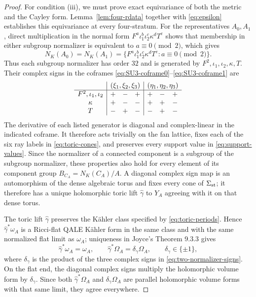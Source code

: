 \documentclass[11pt]{article}
\theoremstyle{remark}\newtheorem{remark}[theorem]{Remark}
\begin{document}
\begin{proof}
For condition (iii), we must prove exact equivariance of both the metric
and the Cayley form.  Lemma~\ref{lem:four-rdata} together with
\eqref{eq:epsilon} establishes this equivariance at every four-stratum.
For the representatives $A_0,A_1$, direct multiplication in the normal
form $F^a\iota_1^b\iota_2^c\kappa^dT^e$ shows that membership in either
subgroup normalizer is equivalent to $a\equiv0\pmod2$, which gives
\begin{equation}\label{eq:two-normalizers}
N_K(A_0)=N_K(A_1)
=\{F^a\iota_1^b\iota_2^c\kappa^dT^e:a\equiv0\pmod2\}.
\end{equation}
Thus each subgroup normalizer has order $32$ and is generated by
$F^2,\iota_1,\iota_2,\kappa,T$.  Their complex signs in the coframes
\eqref{eq:SU3-coframe0}--\eqref{eq:SU3-coframe1} are
\begin{equation}\label{eq:two-normalizer-signs}
\begin{array}{c|ccc|ccc}
&\multicolumn{3}{c|}{(\xi_1,\xi_2,\xi_3)}
&\multicolumn{3}{c}{(\eta_1,\eta_2,\eta_3)}\\
\hline
F^2,\iota_1,\iota_2&+&-&+&+&-&+\\
\kappa&+&-&-&+&+&-\\
T&-&+&-&-&+&-
\end{array}
\end{equation}
The derivative of each listed generator is diagonal and complex-linear in
the indicated coframe.  It therefore acts trivially on the fan lattice,
fixes each of the six ray labels in \eqref{eq:toric-cones}, and preserves
every support value in \eqref{eq:support-values}.  Since the normalizer of
a connected component is a subgroup of the subgroup normalizer, these
properties also hold for every element of its component group
$B_{C_A}=N_K(C_A)/A$.  A diagonal complex sign map is an automorphism of
the dense algebraic torus and fixes every cone of
$\Sigma_{\rm st}$; it therefore has a unique holomorphic toric lift
$\widehat\gamma$ to $Y_A$ agreeing with it on that dense torus.

The toric lift $\widehat\gamma$ preserves the K\"ahler class specified by
\eqref{eq:toric-periods}.  Hence $\widehat\gamma^*\omega_A$ is a
Ricci-flat QALE K\"ahler form in the same class and with the same normalized
flat limit as $\omega_A$; uniqueness in Joyce's Theorem 9.3.3 gives
\begin{equation}\label{eq:normalizer-CY}
\widehat\gamma^*\omega_A=\omega_A,\qquad
\widehat\gamma^*\Omega_A=\delta_\gamma\Omega_A,\qquad
\delta_\gamma\in\{\pm1\},
\end{equation}
where $\delta_\gamma$ is the product of the three complex signs in
\eqref{eq:two-normalizer-signs}.  On the flat end, the diagonal complex
signs multiply the holomorphic volume form by $\delta_\gamma$.  Since both
$\widehat\gamma^*\Omega_A$ and $\delta_\gamma\Omega_A$ are parallel
holomorphic volume forms with that same limit, they agree everywhere.


\end{proof}
\end{document}
